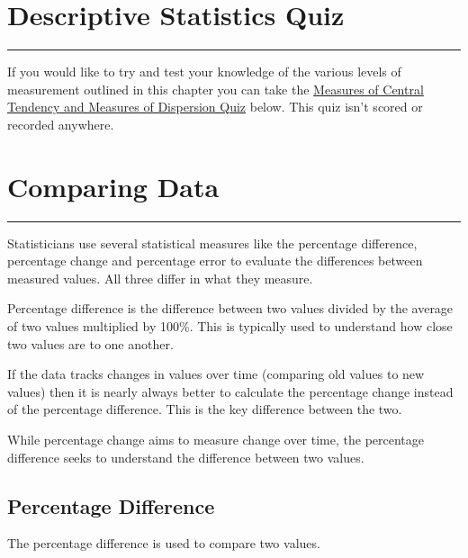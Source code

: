 \documentclass[
]{book}
\begin{document}
\hypertarget{quiztwo}{%
\chapter{Descriptive Statistics Quiz}\label{quiztwo}}

\begin{center}\rule{0.5\linewidth}{0.5pt}\end{center}

If you would like to try and test your knowledge of the various levels of measurement outlined in this chapter you can take the \href{https://view.genial.ly/628a683cb8b7d200114d12a0/presentation-quiz-on-measures}{Measures of Central Tendency and Measures of Dispersion Quiz} below. This quiz isn't scored or recorded anywhere.

\hypertarget{compdat}{%
\chapter{Comparing Data}\label{compdat}}

\begin{center}\rule{0.5\linewidth}{0.5pt}\end{center}

Statisticians use several statistical measures like the percentage difference, percentage change and percentage error to evaluate the differences between measured values. All three differ in what they measure.

Percentage difference is the difference between two values divided by the average of two values multiplied by 100\%. This is typically used to understand how close two values are to one another.

If the data tracks changes in values over time (comparing old values to new values) then it is nearly always better to calculate the percentage change instead of the percentage difference. This is the key difference between the two.

While percentage change aims to measure change over time, the percentage difference seeks to understand the difference between two values.

\hypertarget{percentage-difference}{%
\section{Percentage Difference}\label{percentage-difference}}

The percentage difference is used to compare two values.
\end{document}

